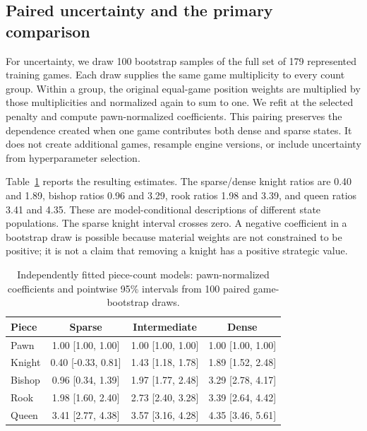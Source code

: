 \subsection{Paired uncertainty and the primary comparison}
For uncertainty, we draw 100 bootstrap samples of the full set of 179 represented training games. Each draw supplies the same game multiplicity to every count group. Within a group, the original equal-game position weights are multiplied by those multiplicities and normalized again to sum to one. We refit at the selected penalty and compute pawn-normalized coefficients. This pairing preserves the dependence created when one game contributes both dense and sparse states. It does not create additional games, resample engine versions, or include uncertainty from hyperparameter selection.

Table~\ref{tab:countvalues} reports the resulting estimates. The sparse/dense knight ratios are 0.40 and 1.89, bishop ratios 0.96 and 3.29, rook ratios 1.98 and 3.39, and queen ratios 3.41 and 4.35. These are model-conditional descriptions of different state populations. The sparse knight interval crosses zero. A negative coefficient in a bootstrap draw is possible because material weights are not constrained to be positive; it is not a claim that removing a knight has a positive strategic value.
\begin{table}[t]\centering
\small
\caption{Independently fitted piece-count models: pawn-normalized coefficients and pointwise 95\% intervals from 100 paired game-bootstrap draws.}\label{tab:countvalues}
\begin{tabular}{lccc}
\toprule
Piece & Sparse & Intermediate & Dense\\\midrule
Pawn & 1.00 [1.00, 1.00] & 1.00 [1.00, 1.00] & 1.00 [1.00, 1.00]\\
Knight & 0.40 [-0.33, 0.81] & 1.43 [1.18, 1.78] & 1.89 [1.52, 2.48]\\
Bishop & 0.96 [0.34, 1.39] & 1.97 [1.77, 2.48] & 3.29 [2.78, 4.17]\\
Rook & 1.98 [1.60, 2.40] & 2.73 [2.40, 3.28] & 3.39 [2.64, 4.42]\\
Queen & 3.41 [2.77, 4.38] & 3.57 [3.16, 4.28] & 4.35 [3.46, 5.61]\\
\bottomrule\end{tabular}\end{table}


